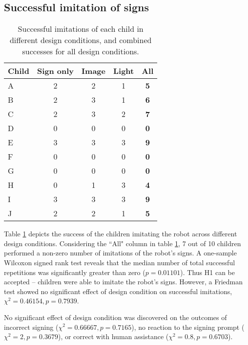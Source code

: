 \subsection{Successful imitation of signs}

\begin{table}
  \centering
  \renewcommand{\arraystretch}{1.2}
  \begin{tabular}{|p{3cm}|c|c|c|c|}
    \hline
    \textbf{Child} &
    \textbf{Sign only} &
    \textbf{Image} &
    \textbf{Light} & 
    \textbf{All}\\
    \hline
    A & 2 & 2 & 1 & \textbf{5}\\ \hline
    B & 2 & 3 & 1 & \textbf{6}\\ \hline
    C & 2 & 3 & 2 & \textbf{7} \\ \hline
    D & 0 & 0 & 0 & \textbf{0} \\ \hline
    E & 3 & 3 & 3 & \textbf{9} \\ \hline
    F & 0 & 0 & 0 & \textbf{0} \\ \hline
    G & 0 & 0 & 0 & \textbf{0} \\ \hline
    H & 0 & 1 & 3 & \textbf{4} \\ \hline
    I & 3 & 3 & 3 & \textbf{9} \\ \hline
    J & 2 & 2 & 1 & \textbf{5} \\ \hline

  \end{tabular}
 
  \caption{Successful imitations of each child in different design conditions, and combined successes for all design conditions.}
  \label{table:imitation}
\end{table}

Table \ref{table:imitation} depicts the success of the children imitating the robot across different design conditions. Considering the ``All" column in table \ref{table:imitation}, 7 out of 10 children performed a non-zero number of imitations of the robot's signs. A one-sample Wilcoxon signed rank test reveals that the median number of total successful repetitions was significantly greater than zero ($p = 0.01101$). Thus H1 can be accepted – children were able to imitate the robot's signs. However, a Friedman test showed no significant effect of design condition on successful imitations, $\chi^2 = 0.46154, p = 0.7939$.

No significant effect of design condition was discovered on the outcomes of incorrect signing ($\chi^2 = 0.66667, p = 0.7165$), no reaction to the signing prompt ($\chi^2 = 2, p = 0.3679$), or correct with human assistance ($\chi^2 = 0.8, p = 0.6703$).

